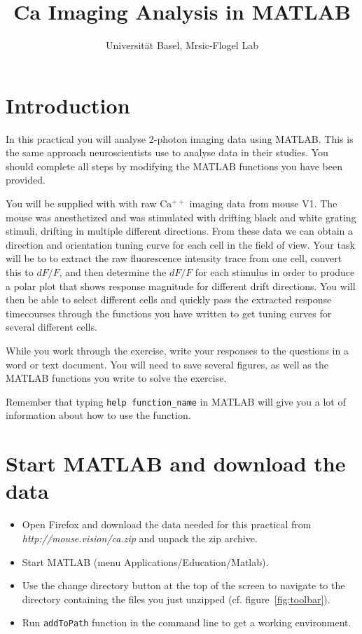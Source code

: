 \documentclass[paper=a4, fontsize=11pt]{article} %
\title{Ca\supr{++} Imaging Analysis in MATLAB}
\author{Universit\"{a}t Basel, Mrsic-Flogel Lab}
\date{}
\numberwithin{equation}{section} %
\numberwithin{figure}{section} %
\numberwithin{table}{section} %
\newcommand{\supr}[1]{\ensuremath{^{#1}}}
\begin{document}
\maketitle %

\section*{Introduction}

In this practical you will analyse 2-photon imaging data using MATLAB. This is the same approach 
neuroscientists use to analyse data in their studies. You should complete all steps by modifying the 
MATLAB functions you have been provided.

You will be supplied with with raw Ca\supr{++} imaging data from mouse V1. The mouse 
was anesthetized and was stimulated with drifting black and white grating stimuli, drifting in multiple different directions. From these data
we can obtain a direction and orientation tuning curve for each cell in the field of view. Your task will be to to 
extract the raw fluorescence intensity trace from one cell, convert this to $dF/F$, and then 
determine the $dF/F$ for each stimulus in order to produce a polar plot that shows response magnitude
for different drift directions. You will then be able to select different cells and quickly pass the extracted 
response timecourses through the functions you have written to get tuning curves for several 
different cells. 

While you work through the exercise, write your responses to the questions in a word or text document. You will need to save several figures, as well as the MATLAB functions you write to solve the exercise.

Remember that typing \texttt{help function\_name} in MATLAB will give you a lot of information about how to use the function.


\section{Start MATLAB and download the data}
\begin{itemize}
\setlength{\parskip}{0.25em}
\item Open Firefox and download the data needed for this practical from \textit{http://mouse.vision/ca.zip} and unpack the zip archive.
\item Start MATLAB (menu Applications/Education/Matlab).
\item Use the change directory button at the top of the screen to navigate to the 
  directory containing the files you just unzipped (cf. figure~\ref{fig:toolbar}). 
\item Run \texttt{addToPath} function in the command line to get a working environment.
\end{itemize}
\end{document}
